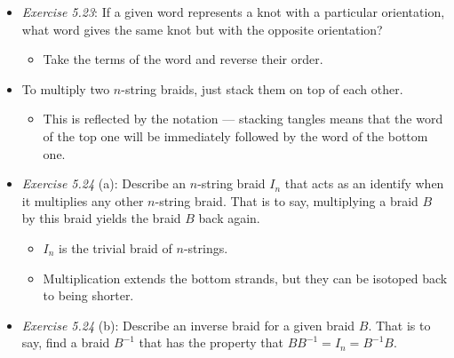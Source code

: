 \documentclass[titlepage]{article}
\numberwithin{figure}{section}
\numberwithin{table}{section}
\numberwithin{equation}{section}
\begin{document}
\begin{itemize}
\begin{figure}[h!]
\begin{subfigure}[b]{0.15\linewidth}
            \caption{$\sigma_i\sigma_i^{-1}$}
            \label{fig:braidIIb}
        \end{subfigure}
        \caption{Braids equivalent via a Type II Reidemeister move.}
        \label{fig:braidII}
    \end{figure}
    \begin{itemize}
        \item If a $\sigma_i\sigma_i^{-1}$ term appears somewhere within a word, it corresponds to the crossings shown in Figure \ref{fig:braidII}.
        \item These crossings can easily be undone via a Type II Reidemesiter move.
        \item In the same way, $\sigma_i\sigma_i^{-1}=1$ by the definition of an inverse, so the term reduces out of the word.
    \end{itemize}
    \item \emph{Exercise 5.23}: If a given word represents a knot with a particular orientation, what word gives the same knot but with the opposite orientation?
    \begin{itemize}
        \item Take the terms of the word and reverse their order.
    \end{itemize}
    \item To multiply two $n$-string braids, just stack them on top of each other.
    \begin{itemize}
        \item This is reflected by the notation --- stacking tangles means that the word of the top one will be immediately followed by the word of the bottom one.
    \end{itemize}
    \item \emph{Exercise 5.24} (a): Describe an $n$-string braid $I_n$ that acts as an identify when it multiplies any other $n$-string braid. That is to say, multiplying a braid $B$ by this braid yields the braid $B$ back again.
    \begin{itemize}
        \item $I_n$ is the trivial braid of $n$-strings.
        \item Multiplication extends the bottom strands, but they can be isotoped back to being shorter.
    \end{itemize}
    \item \emph{Exercise 5.24} (b): Describe an inverse braid for a given braid $B$. That is to say, find a braid $B^{-1}$ that has the property that $BB^{-1}=I_n=B^{-1}B$.

\end{itemize}
\end{document}
